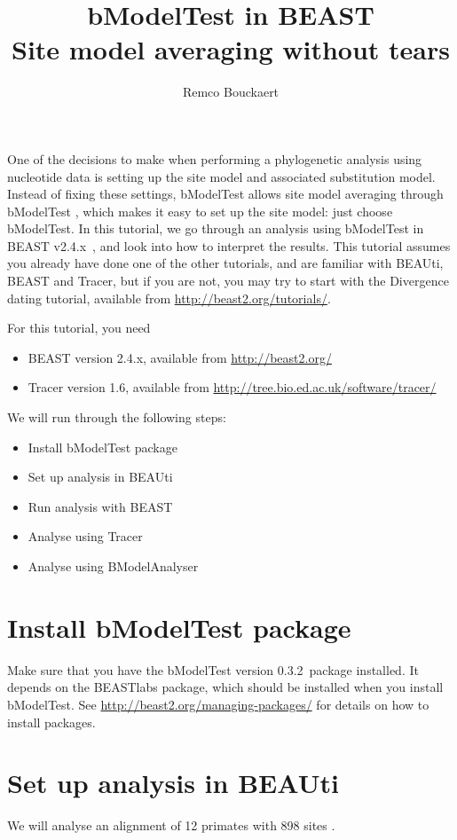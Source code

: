 \documentclass{article}
\title{bModelTest in BEAST {\BEASTVersion}\\
Site model averaging without tears}
\author{Remco Bouckaert}
\newcommand{\BEASTVersion}{2.4.x}
\newcommand{\TracerVersion}{1.6}
\newcommand{\bModelTestVersion}{0.3.2}
\begin{document}
\maketitle

One of the decisions to make when performing a phylogenetic analysis using nucleotide data is setting up the site model and associated substitution model.
Instead of fixing these settings, bModelTest allows site model averaging through bModelTest \cite{bModelTest}, which makes it easy to set up the site model: just choose bModelTest.
In this tutorial, we go through an analysis using bModelTest in BEAST v\BEASTVersion\ \cite{beast}, and look into how to interpret the results.
This tutorial assumes you already have done one of the other tutorials, and are familiar with BEAUti, BEAST and Tracer, but if you are not, you may try to start with the Divergence dating tutorial, available from \url{http://beast2.org/tutorials/}.

For this tutorial, you need
\begin{itemize}
\item BEAST version \BEASTVersion, available from \url{http://beast2.org/}
\item Tracer version \TracerVersion, available from \url{http://tree.bio.ed.ac.uk/software/tracer/}
\end{itemize}

We will run through the following steps:
\begin{itemize}
\item{Install bModelTest package}
\item{Set up analysis in BEAUti}
\item{Run analysis with BEAST}
\item{Analyse using Tracer}
\item{Analyse using BModelAnalyser}
\end{itemize}

\section*{Install bModelTest package}
Make sure that you have the bModelTest version \bModelTestVersion\ package installed. It depends on the BEASTlabs package, which should be installed when you install bModelTest.
See \url{http://beast2.org/managing-packages/} for details on how to install packages.

\section*{Set up analysis in BEAUti}
We will analyse an alignment of 12 primates  with 898 sites \cite{hayasaka1988molecular}. 
\end{document}
